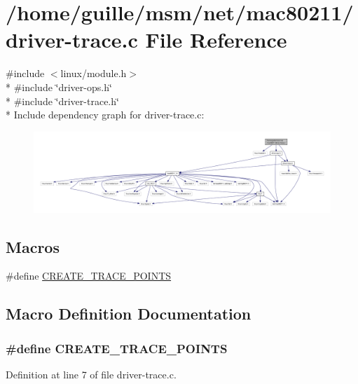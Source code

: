 \hypertarget{driver-trace_8c}{\section{/home/guille/msm/net/mac80211/driver-\/trace.c File Reference}
\label{driver-trace_8c}
}
{\ttfamily \#include $<$linux/module.\-h$>$}\\*
{\ttfamily \#include \char`\"{}driver-\/ops.\-h\char`\"{}}\\*
{\ttfamily \#include \char`\"{}driver-\/trace.\-h\char`\"{}}\\*
Include dependency graph for driver-\/trace.c\-:
\nopagebreak
\begin{figure}[H]
\begin{center}
\leavevmode
\includegraphics[width=350pt]{driver-trace_8c__incl}
\end{center}
\end{figure}
\subsection*{Macros}
\begin{DoxyCompactItemize}
\item 
\#define \hyperlink{driver-trace_8c_a40473b47b4871fa538a0fa131f94e774}{C\-R\-E\-A\-T\-E\-\_\-\-T\-R\-A\-C\-E\-\_\-\-P\-O\-I\-N\-T\-S}
\end{DoxyCompactItemize}


\subsection{Macro Definition Documentation}
\hypertarget{driver-trace_8c_a40473b47b4871fa538a0fa131f94e774}{
\subsubsection[{C\-R\-E\-A\-T\-E\-\_\-\-T\-R\-A\-C\-E\-\_\-\-P\-O\-I\-N\-T\-S}]{\setlength{\rightskip}{0pt plus 5cm}\#define C\-R\-E\-A\-T\-E\-\_\-\-T\-R\-A\-C\-E\-\_\-\-P\-O\-I\-N\-T\-S}}\label{driver-trace_8c_a40473b47b4871fa538a0fa131f94e774}


Definition at line 7 of file driver-\/trace.\-c.

